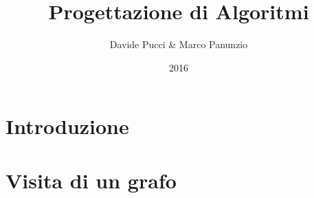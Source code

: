 

\title{Progettazione di Algoritmi}
\author{Davide Pucci \& Marco Panunzio}
\date{2016}



\maketitle

\tableofcontents

\chapter{Introduzione}


\chapter{Visita di un grafo}


